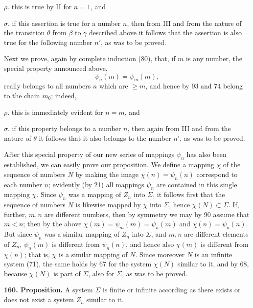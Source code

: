 \documentclass[11pt]{article}
\newcommand{\partof}{\mathrel{\subset}}
\begin{document}
\noindent $\rho.$ this is true by II for $n=1$, and

\noindent $\sigma.$ if this assertion is true for a number $n$, then from III and from the nature of the transition $\theta$ from $\beta$ to $\gamma$ described above it follows that the assertion is also true for the following number $n'$, as was to be proved.

Next we prove, again by complete induction (80), that, if $m$ is any number, the special property announced above,
\[
\psi_n(m)=\psi_m(m),
\]
really belongs to all numbers $n$ which are $\geq m$, and hence by 93 and 74 belong to the chain $m_0$; indeed,

\noindent $\rho.$ this is immediately evident for $n=m$, and

\noindent $\sigma.$ if this property belongs to a number $n$, then again from III and from the nature of $\theta$ it follows that it also belongs to the number $n'$, as was to be proved.

After this special property of our new series of mappings $\psi_n$ has also been established, we can easily prove our proposition. We define a mapping $\chi$ of the sequence of numbers $N$ by making the image $\chi(n)=\psi_n(n)$ correspond to each number $n$; evidently (by 21) all mappings $\psi_n$ are contained in this single mapping $\chi$. Since $\psi_n$ was a mapping of $Z_n$ into $\Sigma$, it follows first that the sequence of numbers $N$ is likewise mapped by $\chi$ into $\Sigma$, hence $\chi(N)\partof\Sigma$. If, further, $m,n$ are different numbers, then by symmetry we may by 90 assume that $m<n$; then by the above $\chi(m)=\psi_m(m)=\psi_n(m)$ and $\chi(n)=\psi_n(n)$. But since $\psi_n$ was a similar mapping of $Z_n$ into $\Sigma$, and $m,n$ are different elements of $Z_n$, $\psi_n(m)$ is different from $\psi_n(n)$, and hence also $\chi(m)$ is different from $\chi(n)$; that is, $\chi$ is a similar mapping of $N$. Since moreover $N$ is an infinite system (71), the same holds by 67 for the system $\chi(N)$ similar to it, and by 68, because $\chi(N)$ is part of $\Sigma$, also for $\Sigma$, as was to be proved.

\noindent\textbf{160. Proposition.} A system $\Sigma$ is finite or infinite according as there exists or does not exist a system $Z_n$ similar to it.
\end{document}
